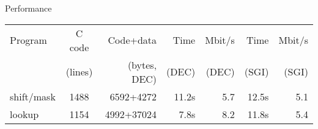 
\topmargin      -1.0cm
\oddsidemargin   1.0cm
\evensidemargin  1.0cm
\textwidth       5.7in
\textheight      9.0in



\Large

{\Huge
\centerline{Performance}
}

\vskip 1.0in
\begin{center}
\begin{tabular}{|l|c|r|r|r|r|r|}
\hline
Program    & C code  & Code+data    & Time   & Mbit/s & Time  & Mbit/s \\
           & (lines) & (bytes, DEC) & (DEC)  & (DEC)  & (SGI) & (SGI) \\
\hline
shift/mask & 1488    & 6592+4272    & 11.2s & 5.7    & 12.5s & 5.1 \\
lookup     & 1154    & 4992+37024   &  7.8s & 8.2    & 11.8s & 5.4 \\
\hline
\end{tabular}
\end{center} 



